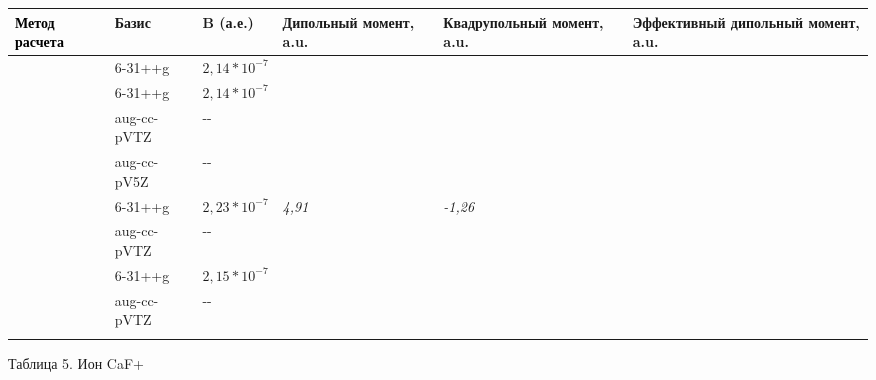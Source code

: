 \bigskip

\begin{flushleft}
\tablefirsthead{}
\tablehead{}
\tabletail{}
\tablelasttail{}
\begin{supertabular}{|m{1.8989999cm}|m{2.476cm}|m{2.2979999cm}|m{2.294cm}|m{2.917cm}|m{3.2849998cm}|}
\hline
\textbf{\textcolor{black}{Метод расчета}} &
\textbf{{Базис}} &
\textbf{{B (а.е.)}} &
\textbf{{Дипольный
момент, a.u.}} &
\textbf{{Квадрупольный
момент, a.u.}} &
\textbf{{Эффективный
дипольный момент,
a.u.}}\\\hline
{} &
{6-31++g} &
\raggedleft  $2,14\ast 10^{-7}$ &
 &
 &
\raggedleft{}\\\hline
{} &
{6-31++g} &
\raggedleft  $2,14\ast 10^{-7}$ &
 &
 &
\raggedleft{}\\\hline
 &
{aug-cc-pVTZ} &
{{}-{}-} &
~
 &
~
 &
~
\\\hhline{~-----}
 &
{aug-cc-pV5Z} &
{{}-{}-} &
~
 &
~
 &
~
\\\hline
{} &
{6-31++g} &
\raggedleft  $2,23\ast 10^{-7}$ &
\raggedleft \textit{{4,91}} &
\raggedleft \textit{{{}-1,26}} &
\raggedleft{}\\\hline
 &
{aug-cc-pVTZ} &
{{}-{}-} &
~
 &
~
 &
~
\\\hline
{} &
{6-31++g} &
\raggedleft  $2,15\ast 10^{-7}$ &
 &
 &
\raggedleft{}\\\hline
 &
{aug-cc-pVTZ} &
{{}-{}-} &
~
 &
~
 &
~
\\\hhline{------}
\end{supertabular}
\end{flushleft}
{\centering
{Таблица 5. Ион
}\foreignlanguage{english}{{CaF}}{+}
\par}

